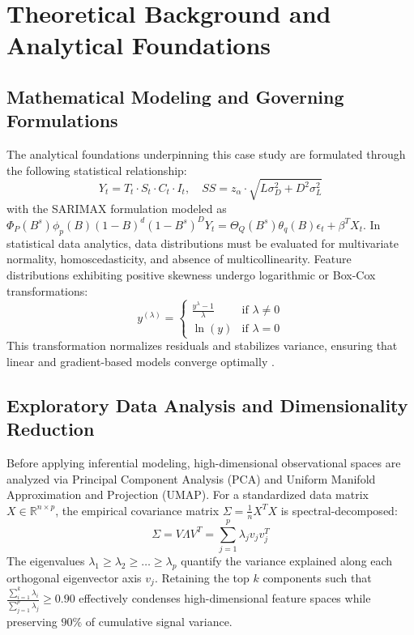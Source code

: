 \section{Theoretical Background and Analytical Foundations}

\subsection{Mathematical Modeling and Governing Formulations}
The analytical foundations underpinning this case study are formulated through the following statistical relationship:
\begin{equation}
  Y_t = T_t \cdot S_t \cdot C_t \cdot I_t, \quad SS = z_{\alpha} \cdot \sqrt{L \sigma_D^2 + D^2 \sigma_L^2}
\label{eq:core_math}
\end{equation}
with the SARIMAX formulation modeled as $\Phi_P(B^s)\phi_p(B)(1-B)^d(1-B^s)^D Y_t = \Theta_Q(B^s)\theta_q(B)\epsilon_t + \beta^T X_t$.
In statistical data analytics, data distributions must be evaluated for multivariate normality, homoscedasticity, and absence of multicollinearity. Feature distributions exhibiting positive skewness undergo logarithmic or Box-Cox transformations:
\begin{equation}
  y^{(\lambda)} = \begin{cases} \frac{y^\lambda - 1}{\lambda} & \text{if } \lambda \neq 0 \\ \ln(y) & \text{if } \lambda = 0 \end{cases}
\end{equation}
This transformation normalizes residuals and stabilizes variance, ensuring that linear and gradient-based models converge optimally \cite{wickham2016r}.

\subsection{Exploratory Data Analysis and Dimensionality Reduction}
Before applying inferential modeling, high-dimensional observational spaces are analyzed via Principal Component Analysis (PCA) and Uniform Manifold Approximation and Projection (UMAP). For a standardized data matrix $X \in \mathbb{R}^{n \times p}$, the empirical covariance matrix $\Sigma = \frac{1}{n} X^T X$ is spectral-decomposed:
\begin{equation}
  \Sigma = V \Lambda V^T = \sum_{j=1}^p \lambda_j v_j v_j^T
\end{equation}
The eigenvalues $\lambda_1 \ge \lambda_2 \ge \dots \ge \lambda_p$ quantify the variance explained along each orthogonal eigenvector axis $v_j$. Retaining the top $k$ components such that $\frac{\sum_{i=1}^k \lambda_i}{\sum_{j=1}^p \lambda_j} \ge 0.90$ effectively condenses high-dimensional feature spaces while preserving $90\%$ of cumulative signal variance.

